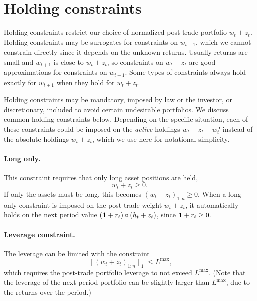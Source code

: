 \documentclass[openany]{article}  %
\newcommand{\wb}{w^\mathrm{b}}
\begin{document}

\section{Holding constraints}
\label{s-holding-constr}
Holding constraints restrict our choice
of normalized post-trade portfolio $w_t + z_t$.
Holding constraints may be surrogates for constraints on $w_{t+1}$,
which we cannot constrain directly since it depends on the unknown returns.
Usually returns are small and $w_{t+1}$ is close to $w_t + z_t$,
so constraints on $w_t + z_t$ are good approximations for constraints on $w_{t+1}$.
Some types of constraints always hold exactly for $w_{t+1}$ when they hold for
$w_t + z_t$.

Holding constraints may be mandatory, imposed by law or the investor,
or discretionary, included to avoid certain undesirable portfolios.
We discuss common holding constraints below.
Depending on the specific situation, each of these constraints could be imposed
on the \emph{active} holdings $w_t + z_t - \wb_t$ instead of the absolute
holdings $w_t + z_t$, which we use here for notational simplicity.

\paragraph{Long only.}
This constraint requires that only long asset positions are held,
\[
w_t + z_t \geq 0.
\]
If only the assets must be long, this becomes $(w_t + z_t)_{1:n} \geq 0$.
When a long only constraint is imposed on the post-trade weight $w_t+z_t$,
it automatically holds on the next period value $(\mathbf 1+r_t)\circ(h_t+z_t)$,
since $\mathbf 1 + r_t \geq 0$.

\paragraph{Leverage constraint.}
The leverage can be limited with the constraint
\[
\|(w_t + z_t)_{1:n} \|_1 \leq L^\mathrm{max},
\]
which requires the post-trade portfolio leverage to not exceed $L^\mathrm{max}$.
(Note that the leverage of the next period portfolio can be slightly
larger than $L^\mathrm{max}$, due to the returns over the period.)
\end{document}
